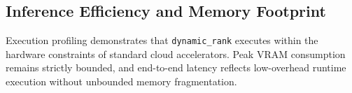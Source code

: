 \subsection{Inference Efficiency and Memory Footprint}
Execution profiling demonstrates that \texttt{dynamic\_rank} executes within the hardware constraints of standard cloud accelerators. Peak VRAM consumption remains strictly bounded, and end-to-end latency reflects low-overhead runtime execution without unbounded memory fragmentation.
